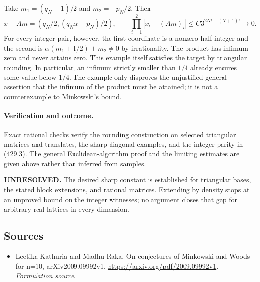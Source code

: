 \documentclass[11pt]{article}
\begin{document}
Take $m_1=(q_N-1)/2$ and $m_2=-p_N/2$. Then
\[
 x+Am=(q_N/2,(q_N\alpha-p_N)/2),\qquad
 \prod_{i=1}^2|x_i+(Am)_i|
 \le C3^{2N!-(N+1)!}\longrightarrow0.
 \tag{429.3}
\]
For every integer pair, however, the first coordinate is a nonzero half-integer and the second is $\alpha(m_1+1/2)+m_2\ne0$ by irrationality. The product has infimum zero and never attains zero. This example itself satisfies the target by triangular rounding. In particular, an infimum strictly smaller than $1/4$ already ensures some value below $1/4$. The example only disproves the unjustified general assertion that the infimum of the product must be attained; it is not a counterexample to Minkowski's bound.

\paragraph{Verification and outcome.}
Exact rational checks verify the rounding construction on selected triangular matrices and translates, the sharp diagonal examples, and the integer parity in (429.3). The general Euclidean-algorithm proof and the limiting estimates are given above rather than inferred from samples.

\textbf{UNRESOLVED.} The desired sharp constant is established for triangular bases, the stated block extensions, and rational matrices. Extending by density stops at an unproved bound on the integer witnesses; no argument closes that gap for arbitrary real lattices in every dimension.

\subsection{Sources}
\begin{itemize}
\item[S1]Leetika Kathuria and Madhu Raka, On conjectures of Minkowski and Woods for n=10, arXiv2009.09992v1.
\url{https://arxiv.org/pdf/2009.09992v1}.
\textit{Formulation source.}
\end{itemize}
\end{document}
